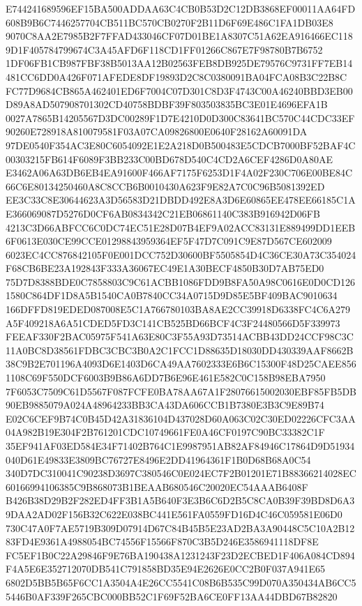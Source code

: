 \documentclass[UTF8,fontset=fandol,zihao=-4,a4paper]{ctexart}
\begin{document}
{{E744241689596EF15BA500ADDAA63C4CB0B53D2C12DB3868EF00011AA64FD608B9B6C7446257704CB511BC570CB0270F2B11D6F69E486C1FA1DB03E8
9070C8AA2E7985B2F7FFAD433046CF07D01BE1A8307C51A62EA916466EC1189D1F405784799674C3A45AFD6F118CD1FF01266C867E7F98780B7B6752
1DF06FB1CB987FBF38B5013AA12B02563FEB8DB925DE79576C9731FF7EB14481CC6DD0A426F071AFEDE8DF19893D2C8C0380091BA04FCA08B3C22B8C
FC77D9684CB865A462401ED6F7004C07D301C8D3F4743C00A46240BBD3EB00D89A8AD507908701302CD40758BDBF39F803503835BC3E01E4696EFA1B
0027A7865B14205567D3DC00289F1D7E4210D0D300C83641BC570C44CDC33EF90260E728918A810079581F03A07CA09826800E0640F28162A60091DA
97DE0540F354AC3E80C6054092E1E2A218D0B500483E5CDCB7000BF52BAF4C00303215FB614F6089F3BB233C00BD678D540C4CD2A6CEF4286D0A80AE
E3462A06A63DB6EB4EA91600F466AF7175F6253D1F4A02F230C706E00BE84C66C6E80134250460A8C8CCB6B0010430A623F9E82A7C0C96B5081392ED
EE3C33C8E30644623A3D56583D21DBDD492E8A3D6E60865EE478EE66185C1AE366069087D5276D0CF6AB0834342C21EB06861140C383B916942D06FB
4213C3D66ABFCC6C0DC74EC51E28D07B4EF9A02ACC83131E889499DD1EEB6F0613E030CE99CCE01298843959364EF5F47D7C091C9E87D567CE602009
6023EC4CC876842105F0E001DCC752D30600BF5505854D4C36CE30A73C354024F68CB6BE23A192843F333A36067EC49E1A30BECF4850B30D7AB75ED0
75D7D8388BDE0C7858803C9C61ACBB1086FDD9B8FA50A98C0616E0D0CD1261580C864DF1D8A5B1540CA0B7840CC34A0715D9D85E5BF409BAC9010634
166DFFD819EDED087008E5C1A766780103BA8AE2CC39918D6338FC4C6A279A5F409218A6A51CDED5FD3C141CB525BD66BCF4C3F24480566D5F339973
FEEAF330F2BAC05975F541A63E80C3F55A93D73514ACBB43DD24CCF98C3C11A0BC8D38561FDBC3CBC3B0A2C1FCC1D88635D18030DD430339AAF8662B
38C9B2E701196A4093D6E1403D6CA49AA7602333E6B6C15300F48D25CAEE8561108C69F550DCF6003B9B86A6DD7B6E96E461E582C0C158B98EBA7950
7F6053C7509C61D5567F087FCFE0BA78AA67A1F28076615002030EBF85FB5DB90EB9885079A024A48964233BB3CA43DA606CCB1B7380E3B3C9E89B74
E02C6CEF9B74C0B45D42A31836104D437028D60A063C02C30ED02226CFC3AA04A982B19E304F2B761201CDC10749661FE0A46CF0197C90BC33382C1F
35EF941AF03ED584E34F71402B764C1E9987951AB82AF84946C17864D9D51934040D61E49833E3809BC76727E8496E2DD41964361F1B0D68B68A0C54
340D7DC310041C90238D3697C380546C0E024EC7F2B01201E71B88366214028EC60166994106385C9B868073B1BEAAB680546C20020EC54AAAB6408F
B426B38D29B2F282ED4FF3B1A5B640F3E3B6C6D2B5C8CA0B39F39BD8D6A39DAA2AD02F156B32C622E038BC441E561FA0559FD16D4C46C059581E06D0
730C47A0F7AE5719B309D07914D67C84B45B5E23AD2BA3A90448C5C10A2B1283FD4E9361A4988054BC74556F15566F870C3B5D246E3586941118DF8E
FC5EF1B0C22A29846F9E76BA190438A1231243F23D2ECBED1F406A084CD894F4A5E6E352712070DB541C791858BD35E94E2626E0CC2B0F037A941E65
6802D5BB5B65F6CC1A3504A4E26CC5541C08B6B535C99D070A350434AB6CC55446B0AF339F265CBC000BB52C1F69F52BA6CE0FF13AA44DBD67B82820
}}
\end{document}
